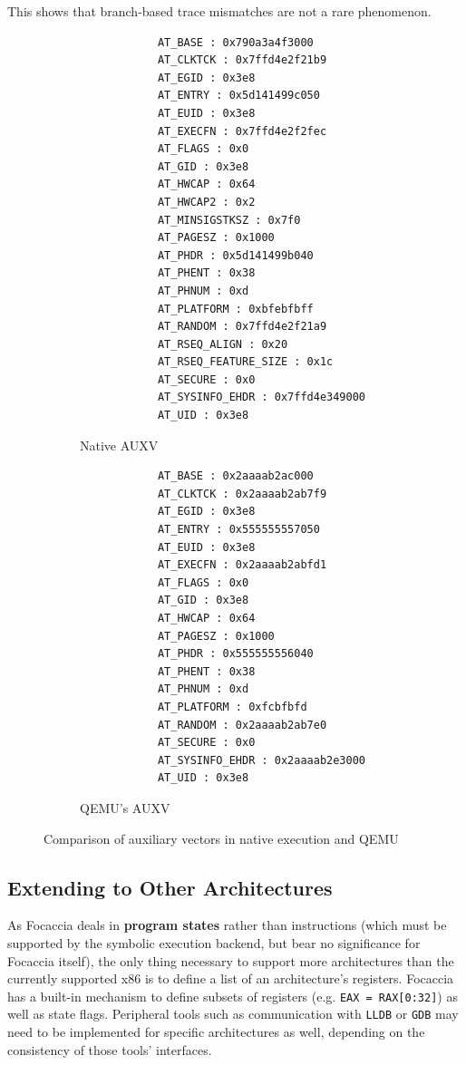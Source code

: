 This shows that branch-based trace mismatches are not a rare phenomenon.

\begin{figure}[htpb]
    \begin{subfigure}[t]{0.4\linewidth}
        \begin{lstlisting}
            AT_BASE : 0x790a3a4f3000
            AT_CLKTCK : 0x7ffd4e2f21b9
            AT_EGID : 0x3e8
            AT_ENTRY : 0x5d141499c050
            AT_EUID : 0x3e8
            AT_EXECFN : 0x7ffd4e2f2fec
            AT_FLAGS : 0x0
            AT_GID : 0x3e8
            AT_HWCAP : 0x64
            AT_HWCAP2 : 0x2
            AT_MINSIGSTKSZ : 0x7f0
            AT_PAGESZ : 0x1000
            AT_PHDR : 0x5d141499b040
            AT_PHENT : 0x38
            AT_PHNUM : 0xd
            AT_PLATFORM : 0xbfebfbff
            AT_RANDOM : 0x7ffd4e2f21a9
            AT_RSEQ_ALIGN : 0x20
            AT_RSEQ_FEATURE_SIZE : 0x1c
            AT_SECURE : 0x0
            AT_SYSINFO_EHDR : 0x7ffd4e349000
            AT_UID : 0x3e8
        \end{lstlisting}
    \caption{Native AUXV}
    \label{fig:native_auxv}
    \end{subfigure}
    \hfill
    \begin{subfigure}[t]{0.4\linewidth}
        \begin{lstlisting}
            AT_BASE : 0x2aaaab2ac000
            AT_CLKTCK : 0x2aaaab2ab7f9
            AT_EGID : 0x3e8
            AT_ENTRY : 0x555555557050
            AT_EUID : 0x3e8
            AT_EXECFN : 0x2aaaab2abfd1
            AT_FLAGS : 0x0
            AT_GID : 0x3e8
            AT_HWCAP : 0x64
            AT_PAGESZ : 0x1000
            AT_PHDR : 0x555555556040
            AT_PHENT : 0x38
            AT_PHNUM : 0xd
            AT_PLATFORM : 0xfcbfbfd
            AT_RANDOM : 0x2aaaab2ab7e0
            AT_SECURE : 0x0
            AT_SYSINFO_EHDR : 0x2aaaab2e3000
            AT_UID : 0x3e8
        \end{lstlisting}
        \caption{QEMU's AUXV}
        \label{fig:qemu_auxv}
    \end{subfigure}
    \caption{Comparison of auxiliary vectors in native execution and QEMU}
    \label{fig:auxv_comparison}
\end{figure}

\subsection{Extending to Other Architectures}

As Focaccia deals in \textbf{program states} rather than instructions (which must be supported by the symbolic execution
backend, but bear no significance for Focaccia itself), the only thing necessary to support more architectures than the
currently supported x86 is to define a list of an architecture's registers. Focaccia has a built-in mechanism to define
subsets of registers (e.g. \texttt{EAX = RAX[0:32]}) as well as state flags. Peripheral tools such as communication with
\texttt{LLDB} or \texttt{GDB} may need to be implemented for specific architectures as well, depending on the
consistency of those tools' interfaces.
